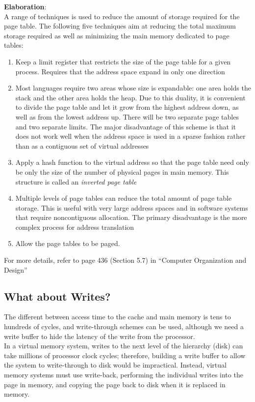 \documentclass[12pt]{article}
\theoremstyle{definition}
\begin{document}
  \textbf{Elaboration}: \\
  A range of techniques is used to reduce the amount of storage required for the page table.
  The following five techniques aim at reducing the total maximum storage required as well as minimizing the main memory dedicated to page tables:
  \begin{enumerate}
    \item Keep a limit register that restricts the size of the page table for a given process.
    Requires that the address space expand in only one direction
    \item Most languages require two areas whose size is expandable: one area holds the stack and the other area holds the heap.
    Due to this duality, it is convenient to divide the page table and let it grow from the highest address down, as well as from the lowest address up.
    There will be two separate page tables and two separate limits.
    The major disadvantage of this scheme is that it does not work well when the address space is used in a sparse fashion rather than as a contiguous set of virtual addresses
    \item Apply a hash function to the virtual address so that the page table need only be only the size of the number of physical pages in main memory.
    This structure is called an \emph{inverted page table}
    \item Multiple levels of page tables can reduce the total amount of page table storage.
    This is useful with very large address spaces and in software systems that require noncontiguous allocation.
    The primary disadvantage is the more complex process for address translation
    \item Allow the page tables to be paged.
  \end{enumerate}
  For more details, refer to page 436 (Section 5.7) in ``Computer Organization and Design''

  \subsection{What about Writes?}
  The different between access time to the cache and main memory is tens to hundreds of cycles, and write-through schemes can be used, although we need a write buffer to hide the latency of the write from the processor. \\
  In a virtual memory system, writes to the next level of the hierarchy (disk) can take millions of processor clock cycles;
  therefore, building a write buffer to allow the system to write-through to disk would be impractical.
  Instead, virtual memory systems must use write-back, performing the individual writes into the page in memory, and copying the page back to disk when it is replaced in memory. \\
\end{document}
